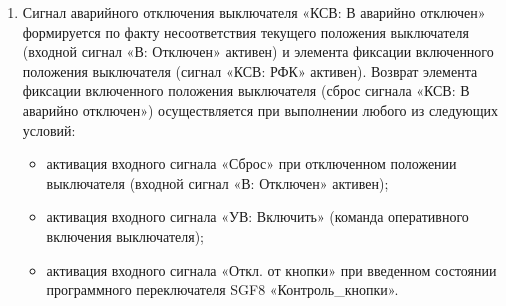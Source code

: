\begin{enumerate}
\item
Сигнал аварийного отключения выключателя «КСВ: В аварийно отключен» формируется по факту несоответствия текущего положения выключателя (входной сигнал «В: Отключен» активен) и элемента фиксации включенного положения выключателя (сигнал «КСВ: РФК» активен). Возврат элемента фиксации включенного положения выключателя (сброс сигнала «КСВ: В аварийно отключен») осуществляется при выполнении любого из следующих условий:
\begin{itemize}
\item активация входного сигнала «Сброс» при отключенном положении выключателя (входной сигнал «В: Отключен» активен);
\item активация входного сигнала «УВ: Включить» (команда оперативного включения выключателя);
\item активация входного сигнала «Откл. от кнопки» при введенном состоянии программного переключателя SGF8 «Контроль\_кнопки».
\end{itemize}


\end{enumerate}
